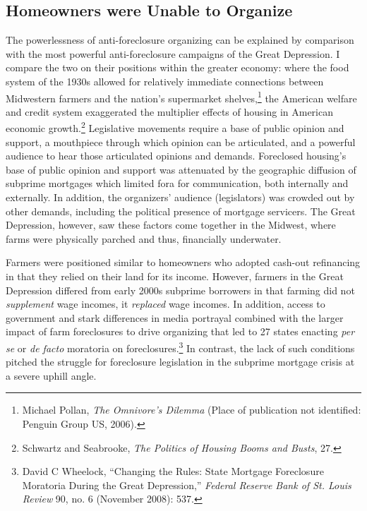 \documentclass[12pt,oneside]{psthesis}
\begin{document}
\hypertarget{homeowners}{%
\subsection{Homeowners were Unable to Organize}\label{homeowners}}

The powerlessness of anti-foreclosure organizing can be explained by comparison with the most powerful anti-foreclosure campaigns of the Great Depression.
I compare the two on their positions within the greater economy: where the food system of the 1930s allowed for relatively immediate connections between Midwestern farmers and the nation's supermarket shelves,\footnote{Michael Pollan, \emph{The Omnivore's Dilemma} (Place of publication not identified: Penguin Group US, 2006).} the American welfare and credit system exaggerated the multiplier effects of housing in American economic growth.\footnote{Schwartz and Seabrooke, \emph{The Politics of Housing Booms and Busts}, 27.}
Legislative movements require a base of public opinion and support, a mouthpiece through which opinion can be articulated, and a powerful audience to hear those articulated opinions and demands.
Foreclosed housing's base of public opinion and support was attenuated by the geographic diffusion of subprime mortgages which limited fora for communication, both internally and externally.
In addition, the organizers' audience (legislators) was crowded out by other demands, including the political presence of mortgage servicers.
The Great Depression, however, saw these factors come together in the Midwest, where farms were physically parched and thus, financially underwater.

Farmers were positioned similar to homeowners who adopted cash-out refinancing in that they relied on their land for its income.
However, farmers in the Great Depression differed from early 2000s subprime borrowers in that farming did not \emph{supplement} wage incomes, it \emph{replaced} wage incomes.
In addition, access to government and stark differences in media portrayal combined with the larger impact of farm foreclosures to drive organizing that led to 27 states enacting \emph{per se} or \emph{de facto} moratoria on foreclosures.\footnote{David C Wheelock, ``Changing the Rules: State Mortgage Foreclosure Moratoria During the Great Depression,'' \emph{Federal Reserve Bank of St. Louis Review} 90, no. 6 (November 2008): 537.}
In contrast, the lack of such conditions pitched the struggle for foreclosure legislation in the subprime mortgage crisis at a severe uphill angle.
\end{document}
